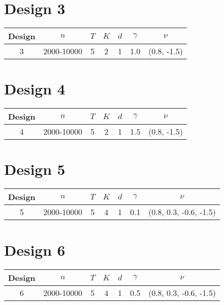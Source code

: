 \documentclass[11pt,letterpaper]{article}
\begin{document}
\section{Design 3}

\begin{table}
\begin{tabular}{ccccccc}
\hline\hline
Design & $n$          & $T$ & $K$ & $d$ & $\gamma$ & $\nu$ \\
\hline
3      & 2000-10000   & 5   & 2   & 1   & 1.0      & (0.8, -1.5)\\
\hline\hline
\end{tabular}
\end{table}


\section{Design 4}

\begin{table}
\begin{tabular}{ccccccc}
\hline\hline
Design & $n$          & $T$ & $K$ & $d$ & $\gamma$ & $\nu$ \\
\hline
4      & 2000-10000   & 5   & 2   & 1   & 1.5      & (0.8, -1.5)\\
\hline\hline
\end{tabular}
\end{table}



\section{Design 5}

\begin{table}
\begin{tabular}{ccccccc}
\hline\hline
Design & $n$          & $T$ & $K$ & $d$ & $\gamma$ & $\nu$ \\
\hline
5      & 2000-10000   & 5   & 4   & 1   & 0.1      & (0.8, 0.3, -0.6, -1.5)\\
\hline\hline
\end{tabular}
\end{table}


\section{Design 6}

\begin{table}
\begin{tabular}{ccccccc}
\hline\hline
Design & $n$          & $T$ & $K$ & $d$ & $\gamma$ & $\nu$ \\
\hline
6      & 2000-10000   & 5   & 4   & 1   & 0.5      & (0.8, 0.3, -0.6, -1.5)\\
\hline\hline
\end{tabular}
\end{table}
\end{document}
